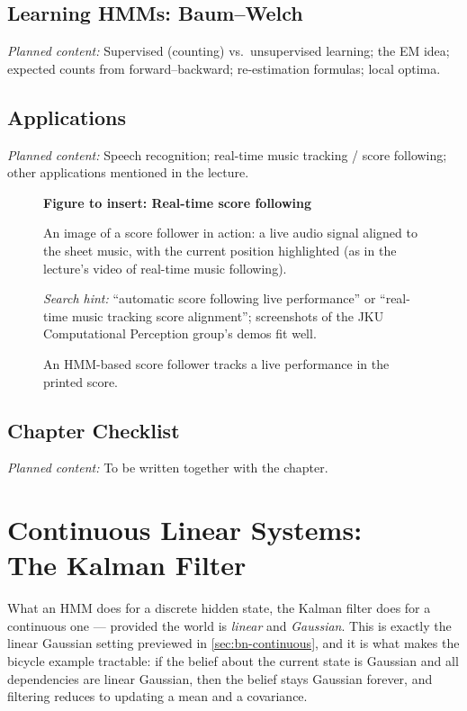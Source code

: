 \documentclass[11pt, oneside]{book}
\newcommand{\figureplaceholder}[5]{%
\begin{figure}[htbp]
\centering
\begin{tcolorbox}[unbreakable,width=\linewidth,height=#1,colback=accent!3,
  colframe=accent!30,boxrule=0.5pt,arc=2.5mm,sharp corners=all,
  valign=center,halign=center,fontupper=\small]
{\bfseries\color{accent}Figure to insert: #2}\par\medskip
{\color{gray!75!black}#3}
\end{tcolorbox}
\caption{#4}\label{#5}
\end{figure}}
\newcommand{\planned}[1]{%
  \par{\small\color{gray!70!black}\textit{Planned content:} #1}\par}
\let\originalsection\section
\renewcommand{\section}{\Needspace{7\baselineskip}\originalsection}
\begin{document}
\section{Learning HMMs: Baum--Welch}
\planned{Supervised (counting) vs.\ unsupervised learning; the EM idea;
expected counts from forward--backward; re-estimation formulas; local optima.}

\section{Applications}
\planned{Speech recognition; real-time music tracking / score following; other
applications mentioned in the lecture.}

\figureplaceholder{4.5cm}{Real-time score following}{An image of a score
follower in action: a live audio signal aligned to the sheet music, with the
current position highlighted (as in the lecture's video of real-time music
following).\par\smallskip
\textit{Search hint:} ``automatic score following live performance'' or
``real-time music tracking score alignment''; screenshots of the JKU
Computational Perception group's demos fit well.}{An HMM-based score follower
tracks a live performance in the printed score.}{fig:score-following}

\section{Chapter Checklist}
\planned{To be written together with the chapter.}


\chapter[Continuous Linear Systems: The Kalman Filter]{Continuous Linear Systems:\\ The Kalman Filter}
\label{ch:kalman}

What an HMM does for a discrete hidden state, the Kalman filter does for a
continuous one --- provided the world is \emph{linear} and \emph{Gaussian}.
This is exactly the linear Gaussian setting previewed in
\cref{sec:bn-continuous}, and it is what makes the bicycle example tractable:
if the belief about the current state is Gaussian and all dependencies are
linear Gaussian, then the belief stays Gaussian forever, and filtering reduces
to updating a mean and a covariance.
\end{document}
